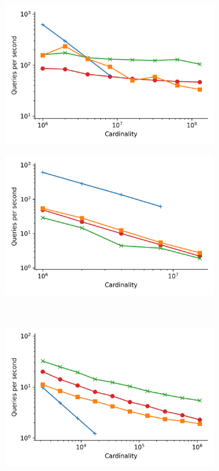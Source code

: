 \documentclass{article}
\begin{document}
\begin{figure}
\begin{subfigure}[b]{0.47\textwidth}
        \includegraphics[width=1.0\textwidth]{plots/sift_PermutedBall_100_throughput.png}
        \label{fig:supplement:sift-scaling}
    \end{subfigure}%
    \begin{subfigure}[b]{0.47\textwidth}
        \includegraphics[width=1.0\textwidth]{plots/random_PermutedBall_100_throughput.png}
        \label{fig:supplement:random-scaling}
    \end{subfigure}%
    \\
    \begin{subfigure}[b]{0.47\textwidth}
        \includegraphics[width=1.0\textwidth]{plots/silva-SSU-Ref_PermutedBall_100_throughput.png}

\end{subfigure}
\end{figure}
\end{document}
